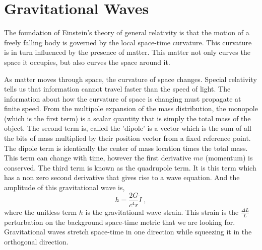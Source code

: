 \acresetall



\section{Gravitational Waves}

The foundation of Einstein's theory of general relativity is that the motion
of a freely falling body is governed by the local space-time curvature.
This curvature is in turn influenced by the presence of
matter.
This matter not only curves the space it occupies, but also curves the space
around it.

As matter moves through space, the curvature of space changes.
Special relativity tells us that information cannot travel faster than the
speed of light.
The information about how the curvature of space is changing must propagate
at finite speed.
From the multipole expansion of the mass distribution, the monopole (which is
the first term) is a scalar quantity that is simply the total
mass of the object.
The second term is, called the 'dipole' is a vector which is the sum of all the
bits of mass multiplied by their position vector from a fixed reference point.
The dipole term is identically the center of mass location times the total mass.
This term can change with time, however the first derivative $mv$ (momentum)
is conserved.
The third term is known as the quadrupole term.
It is this term which has a non zero second derivative that gives rise to a
wave equation.
And the amplitude of this gravitational wave is,
\begin{equation}
h = \frac{2G}{c^4r}\ddot I \;,
\end{equation}
where the unitless term $h$ is the gravitational wave strain.
This strain is the $\frac{\Delta L}{L}$ perturbation on the background
space-time metric that we are looking for.
Gravitational waves stretch space-time in one
direction while squeezing it in the orthogonal direction.



